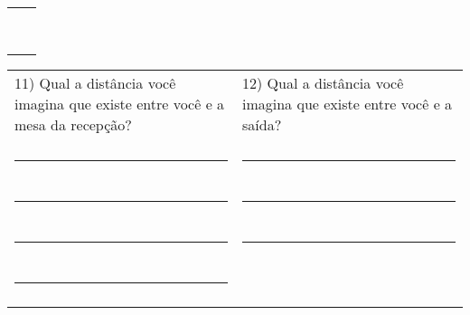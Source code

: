 \begin{table}[!htb]
\begin{tabular}{m{0.5\linewidth} m{0.5\linewidth}}
        & \\
        \rule{\linewidth}{.2mm} & \\
        & \\
\end{tabular}
    \begin{tabular}{m{0.5\linewidth} m{0.5\linewidth}}
        11)	Qual a distância você imagina que existe entre você e a mesa da recepção? & 12)	Qual a distância você imagina que existe entre você e a saída? \\
        & \\
        \rule{\linewidth}{.2mm} & \rule{\linewidth}{.2mm}\\
        & \\
        \rule{\linewidth}{.2mm} & \rule{\linewidth}{.2mm}\\
        & \\
        \rule{\linewidth}{.2mm} & \rule{\linewidth}{.2mm}\\
        & \\
        \rule{\linewidth}{.2mm} & \\
        & \\
    \end{tabular}
\end{table}
%
